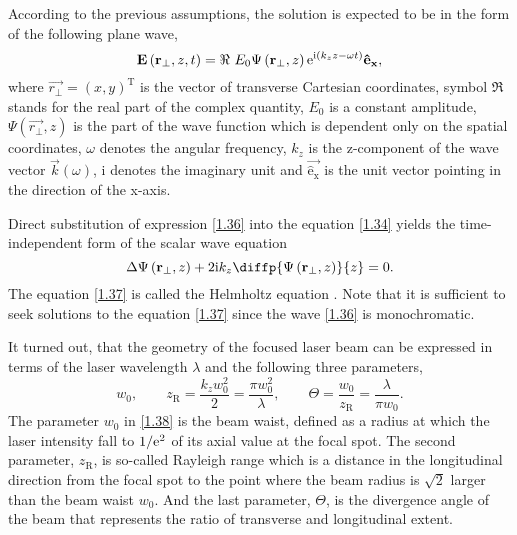 According to the previous assumptions, the solution is expected to be in the form of the following plane wave,
\begin{equation}
\label{1.36}
\mathbf{E}\left(\mathbf{r_\bot}, z, t \right)  = \Re \ E_0 \Psi \left(\mathbf{r_\bot}, z \right) \mathrm{e}^{\mathrm{i} \left(k_z z - \omega t \right)} \mathrm{\mathbf{\hat{e}_x}},
\end{equation}
where $ \vec{r_\bot} = (x, y)^{\mathrm{T}} $ is the vector of transverse Cartesian coordinates, symbol $ \Re $ stands for the real part of the complex quantity, $ E_0 $ is a constant amplitude, $ \Psi \left(\vec{r_\bot}, z \right) $ is the part of the wave function which is dependent only on the spatial coordinates, $ \omega $ denotes the angular frequency, $ k_z $ is the z-component of the wave vector $ \vec{k}\left(\omega \right) $, $ \mathrm{i} $ denotes the imaginary unit and $ \mathrm{\vec{\hat{e}_x}} $ is the unit vector pointing in the direction of the x-axis.

Direct substitution of expression \ref{1.36} into the equation \ref{1.34} yields the time-independent form of the scalar wave equation
\begin{equation}
\label{1.37}
\laplace{\Psi \left(\vec{r_\bot}, z \right)} + 2 \i k_z \diffp{\Psi \left(\vec{r_\bot}, z \right)}{z} = 0.
\end{equation}
The equation \ref{1.37} is called the Helmholtz equation \cite{Born2013}. Note that it is sufficient to seek solutions to the equation \ref{1.37} since the wave \ref{1.36} is monochromatic.

It turned out, that the geometry of the focused laser beam can be expressed in terms of the laser wavelength $ \lambda $ and the following three parameters,
\begin{equation}
\label{1.38}
w_0, \qquad z_{\mathrm{R}} = \frac{k_z w_0^2}{2} = \frac{\pi w_0^2}{\lambda}, \qquad \Theta = \frac{w_0}{z_\mathrm{R}} = \frac{\lambda}{\pi w_0}.
\end{equation}
The parameter $ w_0 $ in \ref{1.38} is the beam waist, defined as a radius at which the laser intensity fall to $ 1/\mathrm{e}^2 $ of its axial value at the focal spot. The second parameter, $ z_\mathrm{R} $, is so-called Rayleigh range which is a distance in the longitudinal direction from the focal spot to the point where the beam radius is $ \sqrt{2} $ larger than the beam waist $ w_0 $. And the last parameter, $ \Theta $, is the divergence angle of the beam that represents the ratio of transverse and longitudinal extent.


